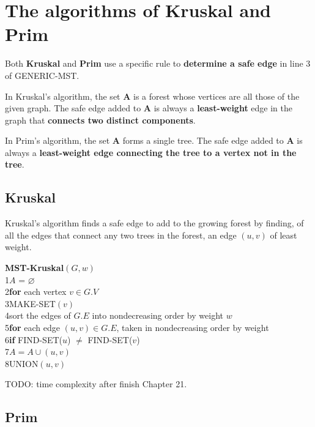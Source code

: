 \section {The algorithms of Kruskal and Prim}

Both \textbf{Kruskal} and \textbf{Prim} use a specific rule to \textbf{determine
  a safe edge} in line 3 of GENERIC-MST.

In Kruskal's algorithm, the set \textbf{A} is a forest whose vertices are all
those of the given graph. The safe edge added to \textbf{A} is always a
\textbf{least-weight} edge in the graph that \textbf{connects two distinct
  components}.

In Prim's algorithm, the set \textbf{A} forms a single tree. The safe edge added
to \textbf{A} is always a \textbf{least-weight edge connecting the tree to a
  vertex not in the tree}.

\subsection {Kruskal}

Kruskal's algorithm finds a safe edge to add to the growing forest by finding,
of all the edges that connect any two trees in the forest, an edge $(u, v)$ of
least weight.

\textbf{MST-Kruskal}$(G, w)$\\
1\space\space $A$ = $\varnothing$\\
2\space\space \textbf{for} each vertex $v \in G.V$\\
3\space\space\space\space MAKE-SET$(v)$\\
4\space\space sort the edges of $G.E$ into nondecreasing order by weight $w$\\
5\space\space \textbf{for} each edge $(u, v) \in G.E$, taken in nondecreasing order by weight\\
6\space\space\space\space \textbf{if} FIND-SET($u$) $\neq$ FIND-SET($v$)\\
7\space\space\space\space\space\space\space $A = A \cup {(u, v)}$\\
8\space\space\space\space\space\space\space UNION$(u, v)$


{\color{red}TODO: time complexity after finish Chapter 21.}



\subsection {Prim}
